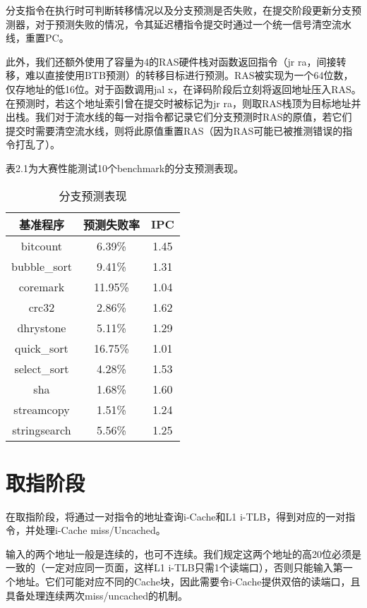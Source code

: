 分支指令在执行时可判断转移情况以及分支预测是否失败，在提交阶段更新分支预测器，对于预测失败的情况，令其延迟槽指令提交时通过一个统一信号清空流水线，重置PC。

此外，我们还额外使用了容量为4的RAS硬件栈对函数返回指令（jr ra，间接转移，难以直接使用BTB预测）的转移目标进行预测。RAS被实现为一个64位数，仅存地址的低16位。对于函数调用jal x，在译码阶段后立刻将返回地址压入RAS。在预测时，若这个地址索引曾在提交时被标记为jr ra，则取RAS栈顶为目标地址并出栈。我们对于流水线的每一对指令都记录它们分支预测时RAS的原值，若它们提交时需要清空流水线，则将此原值重置RAS（因为RAS可能已被推测错误的指令打乱了）。

表2.1为大赛性能测试10个benchmark的分支预测表现。

\begin{table}[htbp]
\centering
\caption{分支预测表现}
\label{fig:enter-label}
\begin{tabular}{c|c|c}
\hline  %
\textbf{基准程序} & \textbf{预测失败率} & \textbf{IPC}\\
\hline
bitcount & 6.39\% & 1.45 \\
bubble\_sort & 9.41\% & 1.31\\
coremark & 11.95\% & 1.04\\
crc32 & 2.86\% & 1.62\\
dhrystone & 5.11\% & 1.29\\
quick\_sort & 16.75\% & 1.01\\
select\_sort & 4.28\% & 1.53\\
sha & 1.68\% & 1.60\\
streamcopy & 1.51\% & 1.24\\
stringsearch & 5.56\% & 1.25\\
\hline
\end{tabular}

\end{table}

\section{取指阶段}

在取指阶段，将通过一对指令的地址查询i-Cache和L1 i-TLB，得到对应的一对指令，并处理i-Cache miss/Uncached。

输入的两个地址一般是连续的，也可不连续。我们规定这两个地址的高20位必须是一致的（一定对应同一页面，这样L1 i-TLB只需1个读端口），否则只能输入第一个地址。它们可能对应不同的Cache块，因此需要令i-Cache提供双倍的读端口，且具备处理连续两次miss/uncached的机制。


